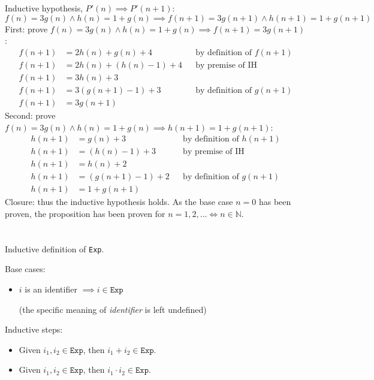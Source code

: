 \documentclass{article}
\begin{document}
Inductive hypothesis, $P'(n) \implies P'(n+1)$:
\[f(n) = 3g(n) \land h(n) = 1 + g(n) \implies f(n+1) = 3g(n+1) \land h(n+1) = 1 + g(n+1)\]
First: prove $f(n) = 3g(n) \land h(n) = 1 + g(n) \implies f(n+1) = 3g(n+1)$:
\begin{align*}
f(n+1) &= 2h(n) + g(n) + 4 && \text{by definition of } f(n+1) \\
f(n+1) &= 2h(n) + (h(n) - 1) + 4 && \text{by premise of IH} \\
f(n+1) &= 3h(n) + 3 \\
f(n+1) &= 3(g(n+1) - 1) + 3 &&  \text{by definition of }g(n+1) \\
f(n+1) &= 3g(n+1)
\end{align*}
Second: prove $f(n) = 3g(n) \land h(n) = 1 + g(n) \implies h(n+1) = 1 + g(n+1)$:
\begin{align*}
h(n+1) &= g(n) + 3 && \text{by definition of } h(n+1) \\
h(n+1) &= (h(n) - 1) + 3 && \text{by premise of IH} \\
h(n+1) &= h(n) + 2 \\
h(n+1) &= (g(n+1) - 1) + 2 && \text{by definition of } g(n+1) \\
h(n+1) &= 1 + g(n+1)
\end{align*}
Closure: thus the inductive hypothesis holds. As the base case $n = 0$ has been proven, the proposition has been proven for $n = 1,2,... \iff n \in \mathbb{N}$.
\newpage
\section{}
\subsection{}
Inductive definition of \texttt{Exp}.

Base cases:
\begin{itemize}
\item $i$ is an identifier $\implies i \in \texttt{Exp}$

(the specific meaning of \emph{identifier} is left undefined)
\end{itemize}
Inductive steps:
\begin{itemize}
\item Given $i_1,i_2 \in \texttt{Exp}$, then $i_1 + i_2 \in \texttt{Exp}$.
\item Given $i_1,i_2 \in \texttt{Exp}$, then $i_1 \cdot i_2 \in \texttt{Exp}$.
\end{itemize}
\end{document}
